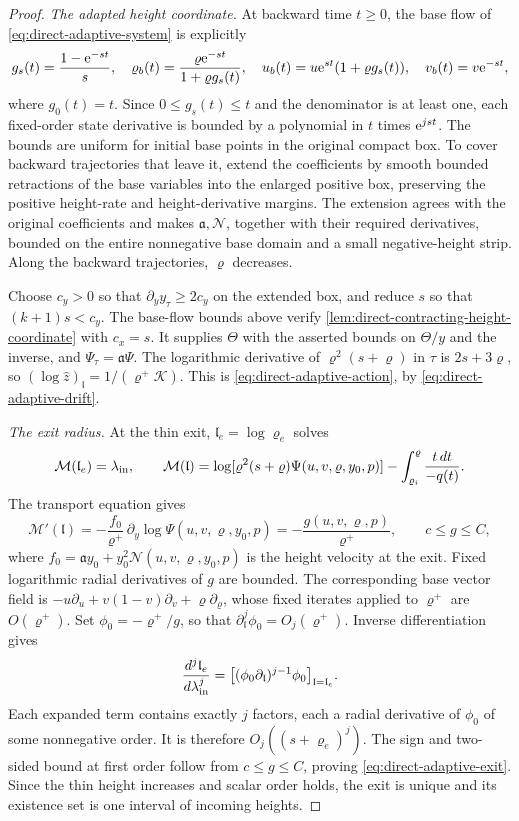 \begin{proof}
\emph{The adapted height coordinate.}
At backward time \(t\ge0\), the base flow of
\eqref{eq:direct-adaptive-system} is explicitly
\[
 g_s(t)=\frac{1-\mathrm e^{-st}}s,\quad
 \varrho_b(t)=\frac{\varrho \mathrm e^{-st}}{1+\varrho g_s(t)},\quad
 u_b(t)=u\mathrm e^{st}(1+\varrho g_s(t)),\quad v_b(t)=v\mathrm e^{-st},
\]
where \(g_0(t)=t\). Since \(0\le g_s(t)\le t\) and the
denominator is at least one, each fixed-order state derivative
is bounded by a polynomial in \(t\) times \(\mathrm e^{jst}\).
The bounds are uniform for initial base points in the original compact
box. To cover backward trajectories that leave it, extend the
coefficients by smooth bounded retractions of the base variables into
the enlarged positive box, preserving the positive height-rate and
height-derivative margins. The extension agrees with the original
coefficients and makes \(\mathfrak a,\mathcal N\), together with their
required derivatives, bounded on the entire nonnegative base domain
and a small negative-height strip. Along the backward trajectories,
\(\varrho\) decreases.

Choose \(c_y>0\) so that \(\partial_y y_\tau\ge2c_y\)
on the extended box, and reduce \(s\) so that
\((k+1)s<c_y\). The base-flow bounds above verify
\cref{lem:direct-contracting-height-coordinate} with \(c_x=s\).
It supplies \(\Theta\) with the asserted bounds on
\(\Theta/y\) and the inverse, and \(\Psi_\tau=\mathfrak a\Psi\).
The logarithmic derivative of \(\varrho^2(s+\varrho)\) in \(\tau\) is
\(2s+3\varrho\), so
\((\log\widehat z)_{\mathfrak l}=1/(\varrho^+\mathcal K)\).
This is \eqref{eq:direct-adaptive-action}, by
\eqref{eq:direct-adaptive-drift}.

\emph{The exit radius.}
At the thin exit, \(\mathfrak l_e=\log\varrho_e\) solves
\[
 \mathcal M(\mathfrak l_e)=\lambda_{\rm in},\qquad
 \mathcal M(\mathfrak l)=
 \log[\varrho^2(s+\varrho)\Psi(u,v,\varrho,y_0,p)]
          -\int_{\varrho_i}^{\varrho}\frac{t\,dt}{-q(t)} .
\]
The transport equation gives
\[
 \mathcal M'(\mathfrak l)
 =-\frac{f_0}{\varrho^+}\,\partial_y\log\Psi(u,v,\varrho,y_0,p)
 =-\frac{g(u,v,\varrho,p)}{\varrho^+},\qquad c\le g\le C,
\]
where \(f_0=\mathfrak a y_0+y_0^2\mathcal N(u,v,\varrho,y_0,p)\) is the
height velocity at the exit. Fixed logarithmic radial derivatives of \(g\) are
bounded. The corresponding base vector field is
\(-u\partial_u+v(1-v)\partial_v+\varrho\partial_\varrho\), whose
fixed iterates applied to \(\varrho^+\) are \(O(\varrho^+)\). Set
\(\phi_0=-\varrho^+/g\), so that \(\partial_{\mathfrak l}^j\phi_0=O_j(\varrho^+)\).
Inverse differentiation gives
\[
 \frac{d^j\mathfrak l_e}{d\lambda_{\rm in}^j}
 =\bigl[(\phi_0\partial_{\mathfrak l})^{j-1}\phi_0\bigr]_{\mathfrak l=\mathfrak l_e}.
\]
Each expanded term contains exactly \(j\) factors, each a
radial derivative of \(\phi_0\) of some nonnegative order.
It is therefore \(O_j((s+\varrho_e)^j)\). The sign and two-sided
bound at first order follow from \(c\le g\le C\), proving
\eqref{eq:direct-adaptive-exit}.
Since the thin height increases and scalar order holds, the
exit is unique and its existence set is one
interval of incoming heights.


\end{proof}
